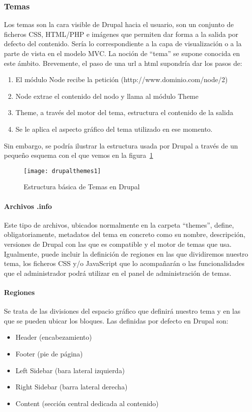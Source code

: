 \subsubsection{Temas}
\par Los temas son la cara visible de Drupal hacia el usuario, son un conjunto de ficheros CSS, HTML/PHP e imágenes que permiten dar forma a la salida por defecto del contenido. Sería lo correspondiente a la capa de visualización o a la parte de vista en el modelo MVC. La noción de ``tema'' se supone conocida en este ámbito. Brevemente, el paso de una url a html supondría dar los pasos de:
\begin{enumerate}
\item El módulo Node recibe la petición (http://www.dominio.com/node/2)
\item Node extrae el contenido del nodo y llama al módulo Theme
\item Theme, a través del motor del tema, estructura el contenido de la salida
\item Se le aplica el aspecto gráfico del tema utilizado en ese momento.
\end{enumerate}

\par Sin embargo, se podría ilustrar la estructura usada por Drupal a través de un pequeño esquema con el que vemos en la figura~\ref{fig:drupalthemes1}
\begin{figure}
\centering
\texttt{[image: drupalthemes1]}
\caption{Estructura básica de Temas en Drupal\cite{references:drupalthemes}}
\label{fig:drupalthemes1}
\end{figure}

 
\paragraph{Archivos .info}
\par Este tipo de archivos, ubicados normalmente en la carpeta ``themes'', define, obligatoriamente, metadatos del tema en concreto como su nombre, descripción, versiones de Drupal con las que es compatible y el motor de temas que usa. Igualmente, puede incluir la definición de regiones en las que dividiremos nuestro tema, los ficheros CSS y/o JavaScript que lo acompañarán o las funcionalidades que el administrador podrá utilizar en el panel de administración de temas.

\paragraph{Regiones}
\par Se trata de las divisiones del espacio gráfico que definirá nuestro tema y en las que se pueden ubicar los bloques. Las definidas por defecto en Drupal son:
\begin{itemize}
\item Header (encabezamiento)
\item Footer (pie de página)
\item Left Sidebar (bara lateral izquierda)
\item Right Sidebar (barra lateral derecha)
\item Content (sección central dedicada al contenido)
\end{itemize}

